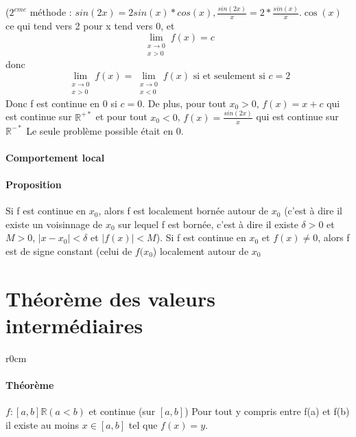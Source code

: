 		($2^{eme}$ méthode : $sin(2x) = 2sin(x)*cos(x), \frac{sin(2x)}{x} = 2*\frac{sin(x)}{x}.\cos(x)$ ce qui tend vers 2 pour x tend vers 0, et \[\lim_{\substack{x\to 0 \\  x > 0}} f(x) = c\] donc \[\lim_{\substack{x\to 0 \\  x > 0}} f(x) = \lim_{\substack{x\to 0 \\  x<0}} f(x) \text{ si et seulement si } c =2\]
		Donc f est continue en 0 si $c=0$. De plus, pour tout $x_0 > 0$, $f(x) = x+c$ qui est continue sur $\mathbb{R}^{+*}$ et pour tout $x_0 < 0$, $f(x) = \frac{sin(2x)}{x}$ qui est continue sur $\mathbb{R}^{-*}$
		Le seule problème possible était en 0.

\paragraph{Comportement local}
\paragraph{Proposition} Si f est continue en $x_0$, alors f est localement bornée autour de $x_0$ (c'est à dire il existe un voisinnage de $x_0$ sur lequel f est bornée, c'est à dire il existe $\delta > 0$ et $M > 0$, $|x-x_0| < \delta$ et $|f(x)| < M$).
Si f est continue en $x_0$ et $f(x) \neq 0$, alors f est de signe constant (celui de $f(x_0$) localement autour de $x_0$

\section{Théorème des valeurs intermédiaires}


\begin{wrapfigure}{r}{0cm}
\end{wrapfigure}
\paragraph{Théorème} $f:[a, b] \mathbb{R} (a < b)$ et continue (sur $[a, b]$)
Pour tout y compris entre f(a) et f(b) il existe au moins $x\in [a, b]$ tel que $f(x) = y$.
